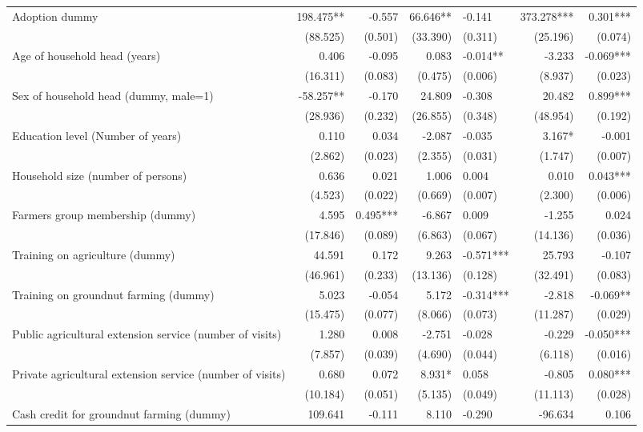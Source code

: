 \documentclass[
]{article}
\begin{document}
\begin{landscape}
\begin{longtable}[t]{lrrrlrr}
\endfoot
\bottomrule
\endlastfoot
Adoption dummy & 198.475** & -0.557 & 66.646** & -0.141 & 373.278*** & 0.301***\\
 & (88.525) & (0.501) & (33.390) & (0.311) & (25.196) & (0.074)\\
Age of household head (years) & 0.406 & -0.095 & 0.083 & -0.014** & -3.233 & -0.069***\\
 & (16.311) & (0.083) & (0.475) & (0.006) & (8.937) & (0.023)\\
Sex of household head (dummy, male=1) & -58.257** & -0.170 & 24.809 & -0.308 & 20.482 & 0.899***\\
\addlinespace
 & (28.936) & (0.232) & (26.855) & (0.348) & (48.954) & (0.192)\\
Education level (Number of years) & 0.110 & 0.034 & -2.087 & -0.035 & 3.167* & -0.001\\
 & (2.862) & (0.023) & (2.355) & (0.031) & (1.747) & (0.007)\\
Household size (number of persons) & 0.636 & 0.021 & 1.006 & 0.004 & 0.010 & 0.043***\\
 & (4.523) & (0.022) & (0.669) & (0.007) & (2.300) & (0.006)\\
\addlinespace
Farmers group membership (dummy) & 4.595 & 0.495*** & -6.867 & 0.009 & -1.255 & 0.024\\
 & (17.846) & (0.089) & (6.863) & (0.067) & (14.136) & (0.036)\\
Training on agriculture (dummy) & 44.591 & 0.172 & 9.263 & -0.571*** & 25.793 & -0.107\\
 & (46.961) & (0.233) & (13.136) & (0.128) & (32.491) & (0.083)\\
Training on groundnut farming (dummy) & 5.023 & -0.054 & 5.172 & -0.314*** & -2.818 & -0.069**\\
\addlinespace
 & (15.475) & (0.077) & (8.066) & (0.073) & (11.287) & (0.029)\\
Public agricultural extension service (number of visits) & 1.280 & 0.008 & -2.751 & -0.028 & -0.229 & -0.050***\\
 & (7.857) & (0.039) & (4.690) & (0.044) & (6.118) & (0.016)\\
Private agricultural extension service (number of visits) & 0.680 & 0.072 & 8.931* & 0.058 & -0.805 & 0.080***\\
 & (10.184) & (0.051) & (5.135) & (0.049) & (11.113) & (0.028)\\
\addlinespace
Cash credit for groundnut farming (dummy) & 109.641 & -0.111 & 8.110 & -0.290 & -96.634 & 0.106\\

\end{longtable}
\end{landscape}
\end{document}
